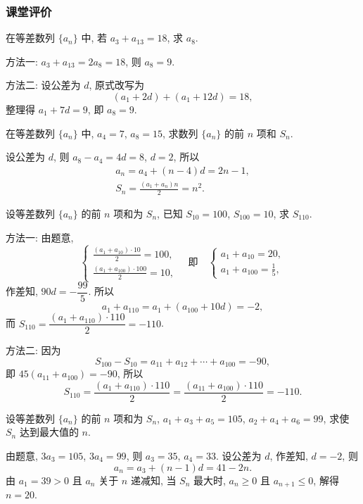 \subsubsection{课堂评价}
\begin{exercise}
    在等差数列 $\{a_n\}$ 中, 若 $a_3+a_{13}=18$, 求 $a_8$.
\end{exercise}
\beginsolution
    方法一: $a_3+a_{13}= 2a_{8}= 18$, 则 $a_8= 9$.

    方法二: 设公差为 $d$, 原式改写为
    \[(a_1+2d)+ (a_1+12d)= 18,\]
    整理得 $a_1+7d= 9$, 即 $a_8= 9$.
\endsolution

\begin{exercise}
    在等差数列 $\{a_n\}$ 中, $a_4=7$, $a_8=15$, 求数列 $\{a_n\}$ 的前 $n$ 项和 $S_n$.
\end{exercise}
\beginsolution
    设公差为 $d$, 则 $a_8- a_4= 4d= 8$, $d=2$, 所以
    \[\begin{gathered}
        a_n= a_4+(n-4)d= 2n-1,\\
        S_n= \frac{(a_1+a_n)n}2= n^2.
    \end{gathered}\]
\endsolution

\begin{exercise}
    设等差数列 $\{a_n\}$ 的前 $n$ 项和为 $S_n$, 已知 $S_{10}=100$, $S_{100}=10$, 求 $S_{110}$.
\end{exercise}
\beginsolution
    方法一: 由题意,
    \[\left\{\!\!\begin{array}{l}
        \frac{(a_1+a_{10})\cdot 10}2= 100,\\
        \frac{(a_1+a_{100})\cdot 100}2= 10,
    \end{array}\right.\quad\text{即}\quad
    \left\{\!\!\begin{array}{l}
        a_1+a_{10}= 20,\\
        a_1+a_{100}= \frac15,
    \end{array}\right.\]
    作差知, $90d=-\dfrac{99}5$. 所以
    \[a_1+a_{110}= a_1+(a_{100}+10d)= -2,\]
    而 $S_{110}= \dfrac{(a_1+a_{110})\cdot 110}2= -110$.

    方法二: 因为
    \[S_{100}-S_{10}= a_{11}+a_{12}+\cdots +a_{100}= -90,\]
    即 $45(a_{11}+a_{100})= -90$, 所以
    \[S_{110}= \frac{(a_{1}+a_{110})\cdot 110}2
        =\frac{(a_{11}+a_{100})\cdot 110}2
        = -110.\]
\endsolution

\begin{exercise}
    设等差数列 $\{a_n\}$ 的前 $n$ 项和为 $S_n$, $a_1+a_3+a_5=105$, $a_2+a_4+a_6=99$, 求使 $S_n$ 达到最大值的 $n$.
\end{exercise}
\beginsolution
    由题意, $3a_3= 105$, $3a_4=99$, 则 $a_3= 35$, $a_4= 33$. 设公差为 $d$, 作差知, $d=-2$, 则
    \[a_n= a_3+(n-1)d= 41-2n.\]
    由 $a_1= 39>0$ 且 $a_n$ 关于 $n$ 递减知, 当 $S_n$ 最大时, $a_n\geqslant 0$ 且 $a_{n+1}\leqslant 0$, 解得 $n=20$.
\endsolution

